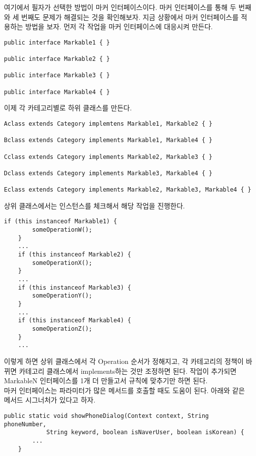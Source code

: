 여기에서 필자가 선택한 방법이 마커 인터페이스이다. 마커 인터페이스를 통해 두 번째와 세 번째도 문제가 해결되는 것을 확인해보자.
지금 상황에서 마커 인터페이스를 적용하는 방법을 보자.
먼저 각 작업을 마커 인터페이스에 대응시켜 만든다.\\

\begin{lstlisting}[frame=single]
public interface Markable1 { }

public interface Markable2 { }

public interface Markable3 { }

public interface Markable4 { }
\end{lstlisting}

 
이제 각 카테고리별로 하위 클래스를 만든다.

\begin{lstlisting}[frame=single]
Aclass extends Category implemtens Markable1, Markable2 { }

Bclass extends Category implements Markable1, Markable4 { }

Cclass extends Category implements Markable2, Markable3 { }

Dclass extends Category implements Markable3, Markable4 { }

Eclass extends Category implements Markable2, Markable3, Markable4 { }
\end{lstlisting}

 
상위 클래스에서는 인스턴스를 체크해서 해당 작업을 진행한다.
\begin{lstlisting}[frame=single]
	if (this instanceof Markable1) { 
		someOperationW();
	}
 	...
	if (this instanceof Markable2) { 
		someOperationX();
	}
	...
	if (this instanceof Markable3) { 
		someOperationY(); 
	} 
	...
	if (this instanceof Markable4) { 
		someOperationZ();
	}
	...
\end{lstlisting}
이렇게 하면 상위 클래스에서 각 Operation 순서가 정해지고, 
각 카테고리의 정책이 바뀌면 카테고리 클래스에서 implements하는 것만 조정하면 된다.
작업이 추가되면 MarkableN 인터페이스를 1개 더 만들고서 규칙에 맞추기만 하면 된다.\\

마커 인터페이스는 파라미터가 많은 메서드를 호출할 때도 도움이 된다.
아래와 같은 메서드 시그너처가 있다고 하자.
\begin{lstlisting}[frame=single]
	public static void showPhoneDialog(Context context, String phoneNumber, 
			String keyword, boolean isNaverUser, boolean isKorean) {
		...
	}
\end{lstlisting}

